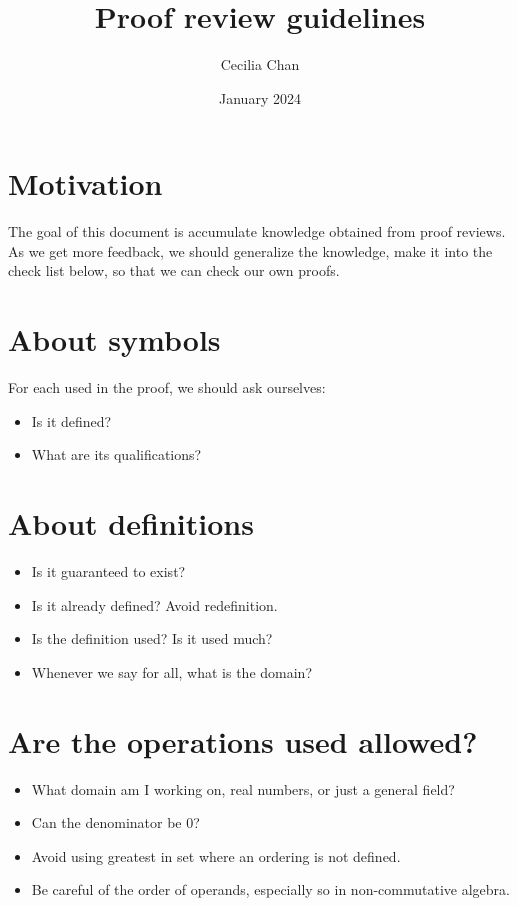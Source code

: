 \documentclass{article}
\title{Proof review guidelines}
\author{Cecilia Chan}
\date{January 2024}
\begin{document}
\maketitle

\section*{Motivation}
The goal of this document is accumulate knowledge obtained from proof reviews. As we get more feedback, we should generalize the knowledge, make it into the check list below, so that we can check our own proofs. 

\section*{About symbols}
For each used in the proof, we should ask ourselves:
\begin{itemize}
    \item Is it defined?
    \item What are its qualifications?
\end{itemize}

\section*{About definitions}
\begin{itemize}
    \item Is it guaranteed to exist?
    \item Is it already defined? Avoid redefinition.
    \item Is the definition used? Is it used much?
    \item Whenever we say for all, what is the domain?
\end{itemize}

\section*{Are the operations used allowed?}
\begin{itemize}
    \item What domain am I working on, real numbers, or just a general field?
    \item Can the denominator be 0?
    \item Avoid using greatest in set where an ordering is not defined.
    \item Be careful of the order of operands, especially so in non-commutative algebra.
\end{itemize}
\end{document}
